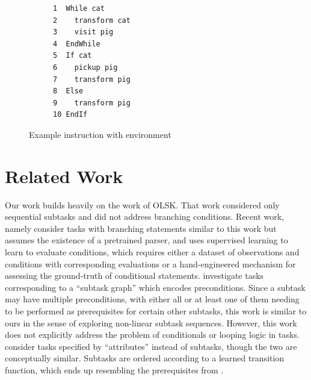 \documentclass{article}
\begin{document}
\begin{figure}[t]
\vskip 0.1in
  \centering
  \begin{subfigure}{.2\columnwidth}
    \centering
  \end{subfigure}%
  \hfill
  \begin{subfigure}{.45\columnwidth}
    \centering
\begin{lstlisting}[]
1  While cat
2    transform cat
3    visit pig
4  EndWhile
5  If cat
6    pickup pig
7    transform pig
8  Else
9    transform pig
10 EndIf
\end{lstlisting}
  \end{subfigure}%
  \hfill
  \caption{Example instruction with environment}
\vskip -0.3in
\end{figure}

\section{Related Work}
Our work builds heavily on the work of OLSK. That work considered
only sequential subtasks and did not address branching conditions. Recent work,
namely \citet{sun2020program} consider tasks with branching statements similar
to this work but assumes the existence of a pretrained parser, and uses
supervised learning to learn to evaluate conditions, which requires either a
dataset of observations and conditions with corresponding evaluations or a
hand-engineered mechanism for assessing the ground-truth of conditional
statements. \citet{sohn2018hierarchical} investigate tasks corresponding to a
``subtask graph'' which encodes preconditions. Since a subtask may have multiple
preconditions, with either all or at least one of them needing to be performed
as prerequisites for certain other subtasks, this work is similar to ours in the
sense of exploring non-linear subtask sequences. However, this work does not
explicitly address the problem of conditionals or looping logic in tasks.
\citet{zhang2018composable} consider tasks specified by ``attributes'' instead
of subtasks, though the two are conceptually similar. Subtasks are ordered
according to a learned transition function, which ends up resembling the
prerequisites from \citet{sohn2018hierarchical}. 
\end{document}

